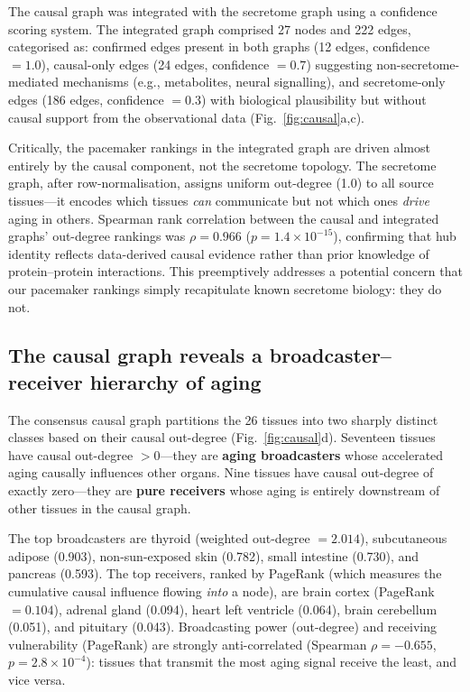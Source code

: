\documentclass[11pt,a4paper]{article}
\begin{document}
The causal graph was integrated with the secretome graph using a confidence scoring system. The integrated graph comprised 27 nodes and 222 edges, categorised as: confirmed edges present in both graphs (12 edges, confidence $= 1.0$), causal-only edges (24 edges, confidence $= 0.7$) suggesting non-secretome-mediated mechanisms (e.g., metabolites, neural signalling), and secretome-only edges (186 edges, confidence $= 0.3$) with biological plausibility but without causal support from the observational data (Fig.~\ref{fig:causal}a,c).

Critically, the pacemaker rankings in the integrated graph are driven almost entirely by the causal component, not the secretome topology. The secretome graph, after row-normalisation, assigns uniform out-degree (1.0) to all source tissues---it encodes which tissues \textit{can} communicate but not which ones \textit{drive} aging in others. Spearman rank correlation between the causal and integrated graphs' out-degree rankings was $\rho = 0.966$ ($p = 1.4 \times 10^{-15}$), confirming that hub identity reflects data-derived causal evidence rather than prior knowledge of protein--protein interactions. This preemptively addresses a potential concern that our pacemaker rankings simply recapitulate known secretome biology: they do not.

\subsection*{The causal graph reveals a broadcaster--receiver hierarchy of aging}

The consensus causal graph partitions the 26 tissues into two sharply distinct classes based on their causal out-degree (Fig.~\ref{fig:causal}d). Seventeen tissues have causal out-degree $> 0$---they are \textbf{aging broadcasters} whose accelerated aging causally influences other organs. Nine tissues have causal out-degree of exactly zero---they are \textbf{pure receivers} whose aging is entirely downstream of other tissues in the causal graph.

The top broadcasters are thyroid (weighted out-degree $= 2.014$), subcutaneous adipose (0.903), non-sun-exposed skin (0.782), small intestine (0.730), and pancreas (0.593). The top receivers, ranked by PageRank (which measures the cumulative causal influence flowing \textit{into} a node), are brain cortex (PageRank $= 0.104$), adrenal gland (0.094), heart left ventricle (0.064), brain cerebellum (0.051), and pituitary (0.043). Broadcasting power (out-degree) and receiving vulnerability (PageRank) are strongly anti-correlated (Spearman $\rho = -0.655$, $p = 2.8 \times 10^{-4}$): tissues that transmit the most aging signal receive the least, and vice versa.
\end{document}
